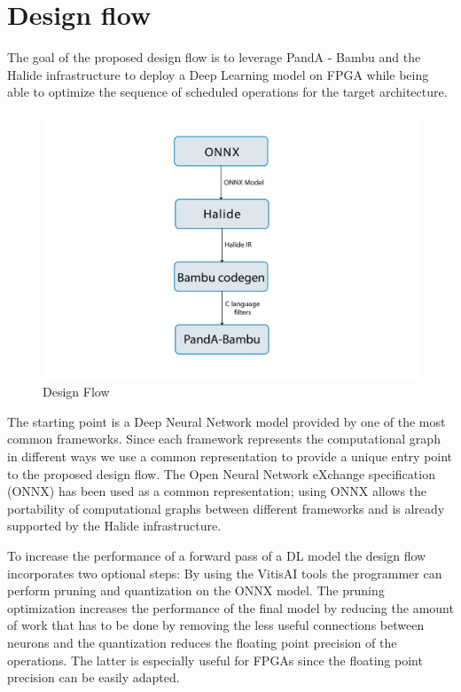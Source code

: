 \documentclass[../main.tex]{subfiles}
\begin{document}
\newpage

\section{Design flow}
\label {design-flow}
The goal of the proposed design flow is to leverage PandA - Bambu and the Halide infrastructure to deploy a Deep Learning model on FPGA while being able to optimize the sequence of scheduled operations for the target architecture.


\begin{figure}[h!]
  \includegraphics[width=1\textwidth]{images/Stack.png}
  \centering
  \caption{Design Flow}
  \label{fig:DesignFlowStack}
\end{figure}

\bigskip
The starting point is a Deep Neural Network model provided by one of the most common frameworks. Since each framework represents the computational graph in different ways we use a common representation to provide a unique entry point to the proposed design flow. The Open Neural Network eXchange specification (ONNX) has been used as a common representation; using ONNX allows the portability of computational graphs between different frameworks and is already supported by the Halide infrastructure.

To increase the performance of a forward pass of a DL model the design flow incorporates two optional steps: By using the VitisAI tools the programmer can perform pruning and quantization on the ONNX model. The pruning optimization increases the performance of the final model by reducing the amount of work that has to be done by removing the less useful connections between neurons and the quantization reduces the floating point precision of the operations. The latter is especially useful for FPGAs since the floating point precision can be easily adapted. 
\end{document}

